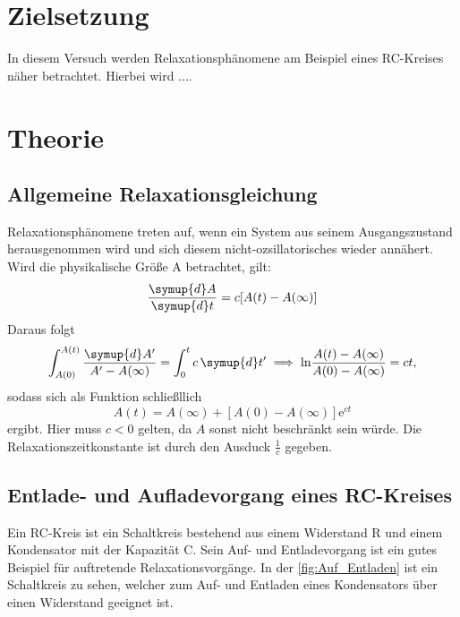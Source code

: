 \section{Zielsetzung}

In diesem Versuch werden Relaxationsphänomene am Beispiel eines RC-Kreises näher betrachtet. Hierbei wird ....
\section{Theorie}
\label{sec:Theorie}

\subsection{Allgemeine Relaxationsgleichung}

    Relaxationsphänomene treten auf, wenn ein System aus seinem Ausgangszustand herausgenommen wird und sich diesem nicht-ozsillatorisches wieder annähert.
    Wird die physikalische Größe A betrachtet, gilt:
    \begin{equation} \label{eq:relaxation}
        \frac{\symup{d}A}{\symup{d}t}=c[A(t)-A(\infty)]
    \end{equation}
    Daraus folgt 
    \begin{equation*}
        \int_{A(0)}^{A(t)} \frac{\symup{d}A'}{A' - A(\infty)} = \int_0^t c \,\symup{d}t' \implies \text{ln} \frac{A(t) - A(\infty)}{A(0) - A(\infty)} = ct,
    \end{equation*}
    sodass sich als Funktion schließllich
    \begin{equation*}
        A(t) = A(\infty) + [A(0) - A(\infty)] \text{e}^{ct}
    \end{equation*}
    ergibt. Hier muss $c<0$ gelten, da $A$ sonst nicht beschränkt sein würde. Die Relaxationszeitkonstante ist durch den Ausduck $\frac{1}{c}$ gegeben.


\subsection{Entlade- und Aufladevorgang eines RC-Kreises}

    Ein RC-Kreis ist ein Schaltkreis bestehend aus einem Widerstand R und einem Kondensator mit der Kapazität C. Sein Auf- und Entladevorgang ist ein gutes Beispiel 
    für auftretende Relaxationsvorgänge. In der \autoref{fig:Auf_Entladen} ist ein Schaltkreis zu sehen, welcher zum Auf- und Entladen eines Kondensators über einen 
    Widerstand geeignet ist.

